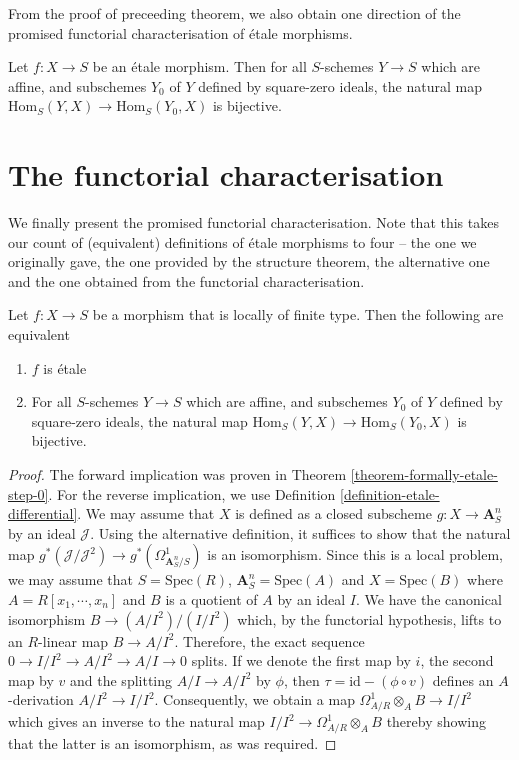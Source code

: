 \noindent
From the proof of preceeding theorem, we also obtain one direction of the
promised functorial characterisation of \'etale morphisms.

\begin{theorem}
\label{theorem-formally-etale-step-0}
Let $f:X \to S$ be an \'etale morphism. Then for all $S$-schemes $Y \to S$
which are affine, and subschemes $Y_0$ of $Y$ defined by square-zero ideals,
the natural map $\text{Hom}_S(Y,X) \to \text{Hom}_S(Y_0,X)$ is bijective.
\end{theorem}

\section{The functorial characterisation}
\label{section-functorial-etale}

\noindent
We finally present the promised functorial characterisation. Note that this
takes our count of (equivalent) definitions of \'etale morphisms to four --
the one we originally gave, the one provided by the structure theorem, the
alternative one and the one obtained from the functorial characterisation. 

\begin{theorem}
\label{theorem-formally-etale}
Let $f:X \to S$ be a morphism that is locally of finite type. Then the
following are equivalent
\begin{enumerate}
\item $f$ is \'etale
\item For all $S$-schemes $Y \to S$ which are affine, and subschemes $Y_0$
of $Y$ defined by square-zero ideals, the natural map
$\text{Hom}_S(Y,X) \to \text{Hom}_S(Y_0,X)$ is bijective.
\end{enumerate}
\end{theorem}

\begin{proof}
The forward implication was proven in Theorem
\ref{theorem-formally-etale-step-0}. For the reverse implication, we use
Definition \ref{definition-etale-differential}. We may assume that $X$ is
defined as a closed subscheme $g: X \to \mathbf{A}^n_S$ by an ideal 
$\mathcal{J}$. Using the
alternative definition, it suffices to show that the natural map
$g^*(\mathcal{J}/\mathcal{J}^2) \to g^*(\Omega^1_{\mathbf{A}^n_S/S})$ is an 
isomorphism. Since this is
a local problem, we may assume that $S = \text{Spec}(R)$, $\mathbf{A}^n_S = 
\text{Spec}(A)$ and
$X = \text{Spec}(B)$ where $A = R[x_1,\cdots,x_n]$ and $B$ is a quotient of $A$ 
by
an ideal $I$. We have the canonical isomorphism $B \to (A/I^2)/(I/I^2)$
which, by the functorial hypothesis, lifts to an $R$-linear map
$B \to A/I^2$. Therefore, the exact sequence
$0 \to I/I^2 \to A/I^2 \to A/I \to 0$ splits. If we denote the first map
by $i$, the second map by $v$ and the splitting $A/I \to A/I^2$ by $\phi$,
then $\tau = \mathrm{id} - (\phi \circ v)$ defines an $A$-derivation
$A/I^2 \to I/I^2$. Consequently, we obtain a map
$\Omega^1_{A/R} \otimes_A B \to I/I^2$ which gives an inverse to the
natural map $I/I^2 \to \Omega^1_{A/R} \otimes_A B$ thereby showing that
the latter is an isomorphism, as was required.
\end{proof}

